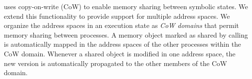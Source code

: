 \klee uses copy-on-write (CoW) to enable memory sharing between symbolic states.
%
We extend this functionality to provide support for multiple address spaces.
%
We organize the address spaces in an execution state as \emph{CoW domains} that permit memory sharing between processes.
%
A memory object marked as shared by calling  is automatically mapped in the address spaces of the other processes within the CoW domain.  Whenever a shared object is modified in one address space, the new version is automatically propagated to the other members of the CoW domain.

